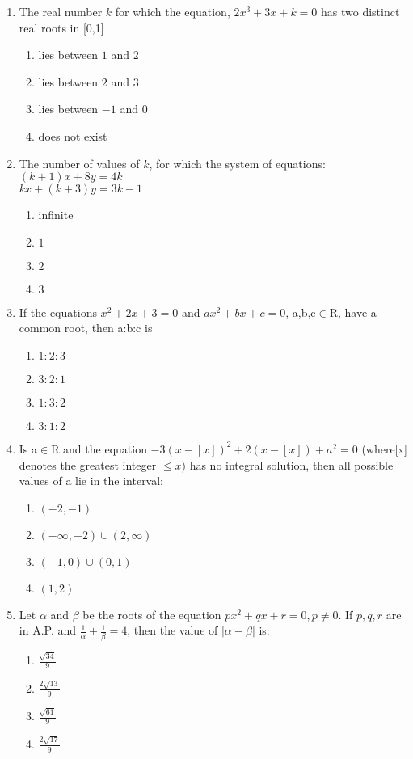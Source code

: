 \documentclass[journal,12pt,twocolumn]{IEEEtran}
\begin{document}
\begin{enumerate}[label=\arabic*]
\item The real number $k$ for which the equation, $2x^3+3x+k=0$ has two distinct real roots in [0,1]
\begin{enumerate}
\item lies between $1$ and $2$
\item lies between $2$ and $3$
\item lies between $-1$ and $0$
\item does not exist 
\end{enumerate}

\item The number of values of $k$, for which the system of equations:\\
$(k+1)x+8y=4k$\\
$kx+(k+3)y=3k-1$
\begin{enumerate}
\item infinite
\item $1$
\item $2$
\item $3$
\end{enumerate}

\item If the equations $x^2+2x+3=0$ and $ax^2+bx+c=0$, a,b,c$\in$R, have a common root, then a:b:c is
\begin{enumerate}
\item $1:2:3$
\item $3:2:1$
\item $1:3:2$
\item $3:1:2$ 
\end{enumerate}

\item Is a$\in$R and the equation $-3(x-[x])^2+2(x-[x])+a^2=0$ 
(where[x] denotes the greatest integer $\leq{x})$ has no integral solution, then all possible values of a lie in the interval:
\begin{enumerate}
\item $(-2,-1)$
\item $(-\infty,-2)\cup(2,\infty)$
\item $(-1,0)\cup(0,1)$
\item $(1,2)$
\end{enumerate}

\item Let $\alpha$ and $\beta$ be the roots of the equation $px^2+qx+r=0,p\neq0$. If $p,q,r$ are in A.P. and $\frac{1}{\alpha}+\frac{1}{\beta}=4$, then the value of $|\alpha-\beta|$ is:
\begin{enumerate}
\item $\frac{\sqrt{34}}{9}$
\item $\frac{2\sqrt{13}}{9}$
\item $\frac{\sqrt{61}}{9}$
\item $\frac{2\sqrt{17}}{9}$
\end{enumerate}


\end{enumerate}
\end{document}
